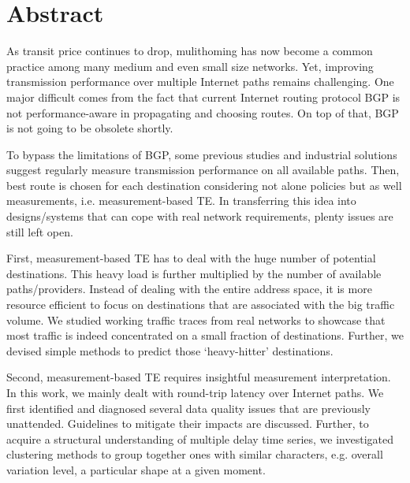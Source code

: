 \begingroup
\let\clearpage\relax
\let\cleardoublepage\relax
\let\cleardoublepage\relax

\chapter*{Abstract}

As transit price continues to drop, mulithoming has now become a common practice among many medium and even small size networks. Yet, improving transmission performance over multiple Internet paths remains challenging.
One major difficult comes from the fact that current Internet routing protocol \acf{BGP} is not performance-aware in propagating and choosing routes. 
On top of that, \ac{BGP} is not going to be obsolete shortly.

To bypass the limitations of \ac{BGP}, some previous studies and industrial solutions suggest regularly measure transmission performance on all available paths.
Then, best route is chosen for each destination considering not alone policies but as well measurements, i.e. measurement-based \acf{TE}.
In transferring this idea into designs/systems that can cope with real network requirements, plenty issues are still left open.

First, measurement-based TE has to deal with the huge number of potential destinations.
This heavy load is further multiplied by the number of available paths/providers.
Instead of dealing with the entire address space, it is more resource efficient to focus on destinations that are associated with the big traffic volume.
We studied working traffic traces from real networks to showcase that most traffic is indeed concentrated on a small fraction of destinations.
Further, we devised simple methods to predict those `heavy-hitter' destinations.

Second, measurement-based TE requires insightful measurement interpretation.
In this work, we mainly dealt with round-trip latency over Internet paths.
We first identified and diagnosed several data quality issues that are previously unattended.
Guidelines to mitigate their impacts are discussed.
Further, to acquire a structural understanding of multiple delay time series, we investigated clustering methods to group together ones with similar characters, e.g. overall variation level, a particular shape at a given moment.

